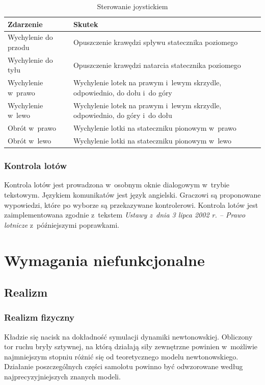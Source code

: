 \documentclass{mwrep}
\begin{document}
\begin{center}
\begin{table}[h]
\begin{center}
\caption{Sterowanie joystickiem}\label{T:Sterowanie_joystickiem}
\vspace{3ex}
\begin{tabularx}{1\textwidth}{|l|X|}
\hline
Zdarzenie & Skutek \\ \hline
Wychylenie do przodu & Opuszczenie krawędzi spływu statecznika poziomego \\
Wychylenie do tyłu & Opuszczenie krawędzi natarcia statecznika poziomego \\
Wychylenie w~prawo & Wychylenie lotek na prawym i~lewym skrzydle, odpowiednio, do dołu i~do góry \\
Wychylenie w~lewo & Wychylenie lotek na prawym i~lewym skrzydle, odpowiednio, do góry i~do dołu \\
Obrót w~prawo & Wychylenie lotki na stateczniku pionowym w~prawo \\
Obrót w~lewo & Wychylenie lotki na stateczniku pionowym w~lewo \\
\hline
\end{tabularx}
\end{center}
\end{table}
\end{center}

\subsection{Kontrola lotów}

Kontrola lotów jest prowadzona w~osobnym oknie dialogowym w~trybie tekstowym. Językiem komunikatów jest język angielski. Graczowi są proponowane wypowiedzi, które po wyborze są przekazywane kontrolerowi. Kontrola lotów jest zaimplementowana zgodnie z~tekstem \emph{Ustawy z~dnia 3 lipca 2002 r. -- Prawo lotnicze} z~późniejszymi poprawkami.

\chapter{Wymagania niefunkcjonalne}

\section{Realizm}
\subsection{Realizm fizyczny}
Kładzie się nacisk na dokładność symulacji dynamiki newtonowskiej. Obliczony tor ruchu bryły sztywnej, na którą działają siły zewnętrzne powinien w~możliwie najmniejszym stopniu różnić się od teoretycznego modelu newtonowskiego.\\
Działanie poszczególnych części samolotu powinno być odwzorowane według najprecyzyjniejszych znanych modeli.
\end{document}
